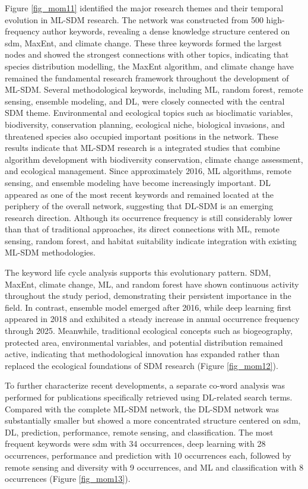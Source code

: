 \documentclass[authoryear,preprint,review,12pt]{elsarticle}
\begin{document}
Figure \ref{fig_mom11} identified the major research themes and their temporal evolution in ML-SDM research. The network was constructed from 500 high-frequency author keywords, revealing a dense knowledge structure centered on sdm, MaxEnt, and climate change. These three keywords formed the largest nodes and showed the strongest connections with other topics, indicating that species distribution modelling, the MaxEnt algorithm, and climate change have remained the fundamental research framework throughout the development of ML-SDM. Several methodological keywords, including ML, random forest, remote sensing, ensemble modeling, and DL, were closely connected with the central SDM theme. Environmental and ecological topics such as bioclimatic variables, biodiversity, conservation planning, ecological niche, biological invasions, and threatened species also occupied important positions in the network. These results indicate that ML-SDM research is a integrated studies that combine algorithm development with biodiversity conservation, climate change assessment, and ecological management. Since approximately 2016, ML algorithms, remote sensing, and ensemble modeling have become increasingly important. DL appeared as one of the most recent keywords and remained located at the periphery of the overall network, suggesting that DL-SDM is an emerging research direction. Although its occurrence frequency is still considerably lower than that of traditional approaches, its direct connections with ML, remote sensing, random forest, and habitat suitability indicate integration with existing ML-SDM methodologies.

The keyword life cycle analysis supports this evolutionary pattern. SDM, MaxEnt, climate change, ML, and random forest have shown continuous activity throughout the study period, demonstrating their persistent importance in the field. In contrast, ensemble model emerged after 2016, while deep learning first appeared in 2018 and exhibited a steady increase in annual occurrence frequency through 2025. Meanwhile, traditional ecological concepts such as biogeography, protected area, environmental variables, and potential distribution remained active, indicating that methodological innovation has expanded rather than replaced the ecological foundations of SDM research (Figure \ref{fig_mom12}).

To further characterize recent developments, a separate co-word analysis was performed for publications specifically retrieved using DL-related search terms. Compared with the complete ML-SDM network, the DL-SDM network was substantially smaller but showed a more concentrated structure centered on sdm, DL, prediction, performance, remote sensing, and classification. The most frequent keywords were sdm with 34 occurrences, deep learning with 28 occurrences, performance and prediction with 10 occurrences each, followed by remote sensing and diversity with 9 occurrences, and ML and classification with 8 occurrences (Figure \ref{fig_mom13}).
\end{document}
